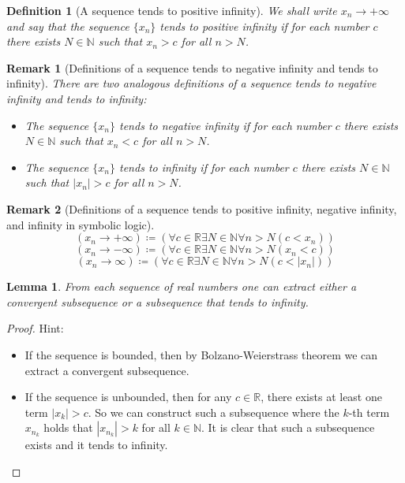 \documentclass[onecolumn]{ctexart}
\newtheorem{definition}{Definition}
\newtheorem{lemma}{Lemma}
\newtheorem{remark}{Remark}
\begin{document}
\begin{definition}[A sequence tends to positive infinity]
  We shall write $x_n \to +\infty$ and say that the sequence $\lbrace x_n 
  \rbrace$ tends to positive infinity if for each number $c$ there exists $N \in 
  \mathbb{N}$ such that $x_n > c$ for all $n > N$.
\end{definition}
\begin{remark}[Definitions of a sequence tends to negative infinity and tends to infinity]
  There are two analogous definitions of a sequence tends to negative infinity 
  and tends to infinity:
  \begin{itemize}
    \item The sequence $\lbrace x_n \rbrace$ tends to negative infinity if for 
    each number $c$ there exists $N \in \mathbb{N}$ such that $x_n < c$ for all 
    $n > N$.
    \item The sequence $\lbrace x_n \rbrace$ tends to infinity if for each number 
    $c$ there exists $N \in \mathbb{N}$ such that $|x_n| > c$ for all $n > N$.
  \end{itemize}
\end{remark}
\begin{remark}[Definitions of a sequence tends to positive infinity, negative infinity, and infinity in symbolic logic]
  \[
    (x_n \to +\infty) \coloneqq (\forall c \in \mathbb{R} \exists N \in \mathbb{N} \forall n > N (c < x_n))
  \]
  \[
    (x_n \to -\infty) \coloneqq (\forall c \in \mathbb{R} \exists N \in \mathbb{N} \forall n > N (x_n < c))
  \]
  \[
    (x_n \to \infty) \coloneqq (\forall c \in \mathbb{R} \exists N \in \mathbb{N} \forall n > N (c < |x_n|))
  \]
\end{remark}

\begin{lemma}
  From each sequence of real numbers one can extract either a convergent 
  subsequence or a subsequence that tends to infinity.
\end{lemma}
\begin{proof}
  Hint:
  \begin{itemize}
    \item If the sequence is bounded, then by Bolzano-Weierstrass theorem we can 
    extract a convergent subsequence.
    \item If the sequence is unbounded, then for any $c \in \mathbb{R}$, there 
    exists at least one term $|x_k| > c$. So we can construct such a subsequence 
    where the $k$-th term $x_{n_k}$ holds that $|x_{n_k}| > k$ for all $k \in 
    \mathbb{N}$. It is clear that such a subsequence exists and it tends to 
    infinity.
  \end{itemize}
\end{proof}
\end{document}
